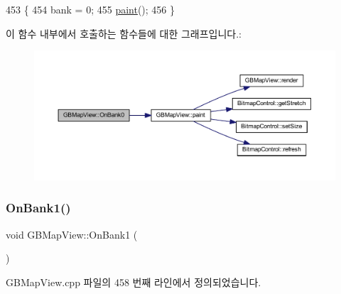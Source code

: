 \begin{DoxyCode}
453 \{
454   bank = 0;
455   \mbox{\hyperlink{class_g_b_map_view_a42de669273417186b01ca6f8d06eb347}{paint}}();
456 \}
\end{DoxyCode}
이 함수 내부에서 호출하는 함수들에 대한 그래프입니다.\+:
\nopagebreak
\begin{figure}[H]
\begin{center}
\leavevmode
\includegraphics[width=350pt]{class_g_b_map_view_a157cce075c5c7ad137098c04201ce30d_cgraph}
\end{center}
\end{figure}
\mbox{\label{class_g_b_map_view_a7a1e36efab710bedd617b431486a42b3}} 
\subsubsection{\texorpdfstring{On\+Bank1()}{OnBank1()}}
{\footnotesize\ttfamily void G\+B\+Map\+View\+::\+On\+Bank1 (\begin{DoxyParamCaption}{ }\end{DoxyParamCaption})\hspace{0.3cm}{\ttfamily [protected]}}



G\+B\+Map\+View.\+cpp 파일의 458 번째 라인에서 정의되었습니다.


